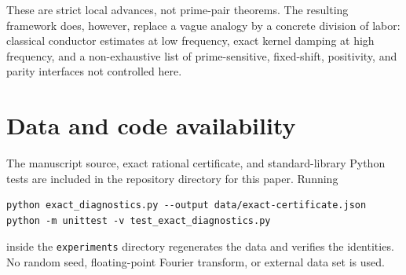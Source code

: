These are strict local advances, not prime-pair theorems.  The resulting framework does, however, replace a vague analogy by a concrete division of labor: classical conductor estimates at low frequency, exact kernel damping at high frequency, and a non-exhaustive list of prime-sensitive, fixed-shift, positivity, and parity interfaces not controlled here.

\section*{Data and code availability}

The manuscript source, exact rational certificate, and standard-library Python tests are included in the repository directory for this paper.  Running
\begin{verbatim}
python exact_diagnostics.py --output data/exact-certificate.json
python -m unittest -v test_exact_diagnostics.py
\end{verbatim}
inside the \texttt{experiments} directory regenerates the data and verifies the identities.  No random seed, floating-point Fourier transform, or external data set is used.
